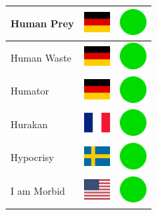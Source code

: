 \documentclass[12pt, a4paper, twoside]{report}
\begin{document}
\begin{center}
\begin{longtable}{|p{5cm}|p{2cm}|p{2cm}|}
 Human Prey                                                 & \includegraphics[width=1cm]{../4x3/de} &   \includegraphics[width=1cm]{../likes/y} \\ \hline
 Human Waste                                                & \includegraphics[width=1cm]{../4x3/de} &   \includegraphics[width=1cm]{../likes/y} \\ \hline
 Humator                                                    & \includegraphics[width=1cm]{../4x3/de} &   \includegraphics[width=1cm]{../likes/y} \\ \hline
 Hurakan                                                    & \includegraphics[width=1cm]{../4x3/fr} &   \includegraphics[width=1cm]{../likes/y} \\ \hline
 Hypocrisy                                                  & \includegraphics[width=1cm]{../4x3/se} &   \includegraphics[width=1cm]{../likes/y} \\ \hline
 I am Morbid                                                & \includegraphics[width=1cm]{../4x3/us} &   \includegraphics[width=1cm]{../likes/y} \\ \hline

\end{longtable}
\end{center}
\end{document}
